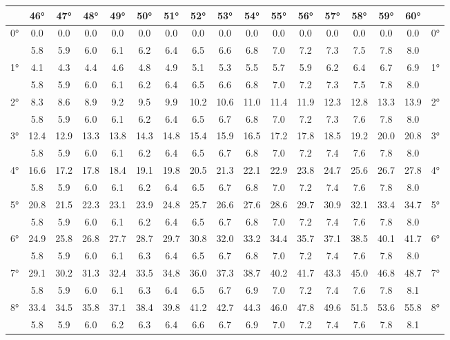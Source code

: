 \begin{footnotesize}\begin{tabular}{c || c | c | c | c | c | c | c | c | c | c | c | c | c | c | c || c}
		\space &46°&47°&48°&49°&50°&51°&52°&53°&54°&55°&56°&57°&58°&59°&60°\\\hline\hline
		\multirow{2}{*}{0°}&0.0&0.0&0.0&0.0&0.0&0.0&0.0&0.0&0.0&0.0&0.0&0.0&0.0&0.0&0.0&\multirow{2}{*}{0°}\\ \space&5.8&5.9&6.0&6.1&6.2&6.4&6.5&6.6&6.8&7.0&7.2&7.3&7.5&7.8&8.0&\space\\\hline
		\multirow{2}{*}{1°}&4.1&4.3&4.4&4.6&4.8&4.9&5.1&5.3&5.5&5.7&5.9&6.2&6.4&6.7&6.9&\multirow{2}{*}{1°}\\ \space&5.8&5.9&6.0&6.1&6.2&6.4&6.5&6.6&6.8&7.0&7.2&7.3&7.5&7.8&8.0&\space\\\hline
		\multirow{2}{*}{2°}&8.3&8.6&8.9&9.2&9.5&9.9&10.2&10.6&11.0&11.4&11.9&12.3&12.8&13.3&13.9&\multirow{2}{*}{2°}\\ \space&5.8&5.9&6.0&6.1&6.2&6.4&6.5&6.7&6.8&7.0&7.2&7.3&7.6&7.8&8.0&\space\\\hline
		\multirow{2}{*}{3°}&12.4&12.9&13.3&13.8&14.3&14.8&15.4&15.9&16.5&17.2&17.8&18.5&19.2&20.0&20.8&\multirow{2}{*}{3°}\\ \space&5.8&5.9&6.0&6.1&6.2&6.4&6.5&6.7&6.8&7.0&7.2&7.4&7.6&7.8&8.0&\space\\\hline
		\multirow{2}{*}{4°}&16.6&17.2&17.8&18.4&19.1&19.8&20.5&21.3&22.1&22.9&23.8&24.7&25.6&26.7&27.8&\multirow{2}{*}{4°}\\ \space&5.8&5.9&6.0&6.1&6.2&6.4&6.5&6.7&6.8&7.0&7.2&7.4&7.6&7.8&8.0&\space\\\hline
		\multirow{2}{*}{5°}&20.8&21.5&22.3&23.1&23.9&24.8&25.7&26.6&27.6&28.6&29.7&30.9&32.1&33.4&34.7&\multirow{2}{*}{5°}\\ \space&5.8&5.9&6.0&6.1&6.2&6.4&6.5&6.7&6.8&7.0&7.2&7.4&7.6&7.8&8.0&\space\\\hline
		\multirow{2}{*}{6°}&24.9&25.8&26.8&27.7&28.7&29.7&30.8&32.0&33.2&34.4&35.7&37.1&38.5&40.1&41.7&\multirow{2}{*}{6°}\\ \space&5.8&5.9&6.0&6.1&6.3&6.4&6.5&6.7&6.8&7.0&7.2&7.4&7.6&7.8&8.0&\space\\\hline
		\multirow{2}{*}{7°}&29.1&30.2&31.3&32.4&33.5&34.8&36.0&37.3&38.7&40.2&41.7&43.3&45.0&46.8&48.7&\multirow{2}{*}{7°}\\ \space&5.8&5.9&6.0&6.1&6.3&6.4&6.5&6.7&6.9&7.0&7.2&7.4&7.6&7.8&8.1&\space\\\hline
		\multirow{2}{*}{8°}&33.4&34.5&35.8&37.1&38.4&39.8&41.2&42.7&44.3&46.0&47.8&49.6&51.5&53.6&55.8&\multirow{2}{*}{8°}\\ \space&5.8&5.9&6.0&6.2&6.3&6.4&6.6&6.7&6.9&7.0&7.2&7.4&7.6&7.8&8.1&\space\\\hline

\end{tabular}
\end{footnotesize}
